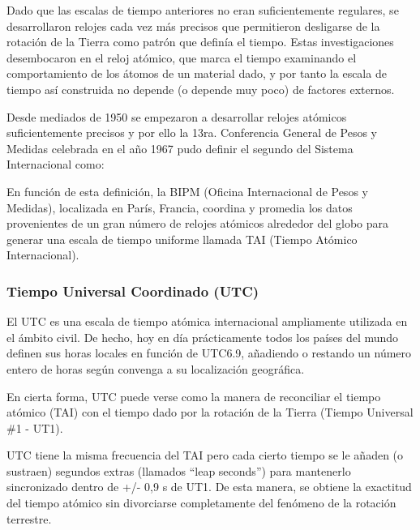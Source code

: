 \documentclass[a4paper,12pt,twoside]{article}
\begin{document}
 Dado que las escalas de tiempo anteriores no eran suficientemente regulares, se desarrollaron relojes cada vez más precisos que permitieron desligarse de la rotación de la Tierra como patrón que definía el tiempo. Estas investigaciones desembocaron en el reloj atómico, que marca el tiempo examinando el comportamiento de los átomos de un material dado, y por tanto la escala de tiempo así construida no depende (o depende muy poco) de factores externos.

Desde mediados de 1950 se empezaron a desarrollar relojes atómicos suficientemente precisos y por ello la 13ra. Conferencia General de Pesos y Medidas celebrada en el año 1967 pudo definir el segundo del Sistema Internacional como:

\vspace{3mm}


\vspace{3mm}

En función de esta definición, la BIPM (Oficina Internacional de Pesos y Medidas), localizada en París, Francia, coordina y promedia los datos provenientes de un gran número de relojes atómicos alrededor del globo para generar una escala de tiempo uniforme llamada TAI (Tiempo Atómico Internacional). 



\subsubsection{Tiempo Universal Coordinado (UTC)}
\label{sec:tiempo.universal.coordinado}
 El UTC es una escala de tiempo atómica internacional ampliamente utilizada en el ámbito civil. De hecho, hoy en día prácticamente todos los países del mundo definen sus horas locales en función de UTC6.9, añadiendo o restando un número entero de horas según convenga a su localización geográfica.

En cierta forma, UTC puede verse como la manera de reconciliar el tiempo atómico (TAI) con el tiempo dado por la rotación de la Tierra (Tiempo Universal \#1 - UT1).

UTC tiene la misma frecuencia del TAI pero cada cierto tiempo se le añaden (o sustraen) segundos extras (llamados ``leap seconds'') para mantenerlo sincronizado dentro de +/- 0,9 s de UT1. De esta manera, se obtiene la exactitud del tiempo atómico sin divorciarse completamente del fenómeno de la rotación terrestre.
\end{document}
